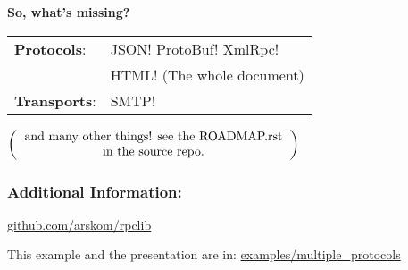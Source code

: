 \documentclass{beamer}
\begin{document}
\begin{frame}
  \huge
  \textbf{So, what's missing?}
  \begin{center}
\Large
  \begin{tabular}{ll}
    \textbf{Protocols}:  & JSON! ProtoBuf! XmlRpc! \\
                         & HTML! (The whole document) \\
    \textbf{Transports}: & SMTP!
  \end{tabular}

  \bigskip

  \large
  $\left(
    \begin{tabular}{c}
    and many other things! see the ROADMAP.rst \\
    in the source repo.
  \end{tabular}
  \right)$

  \end{center}
\end{frame}

\begin{frame}
  \frametitle{Additional Information:}

  \begin{center}
  \huge

  \href{http://github.com/arskom/rpclib}{github.com/arskom/rpclib}

  \bigskip

  \large

  This example and the presentation are in:
  \href{https://github.com/arskom/rpclib/tree/master/examples/multiple_protocols}{examples/multiple\_protocols}

  \bigskip

  \huge


  \end{center}

\end{frame}
\end{document}
